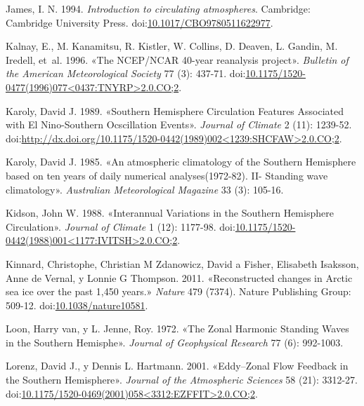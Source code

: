 \documentclass[spanish,a4paper,12p]{book}
\begin{document}
\hypertarget{ref-James}{}
James, I. N. 1994. \emph{Introduction to circulating atmospheres}.
Cambridge: Cambridge University Press.
doi:\href{https://doi.org/10.1017/CBO9780511622977}{10.1017/CBO9780511622977}.

\hypertarget{ref-Kalnay1996}{}
Kalnay, E., M. Kanamitsu, R. Kistler, W. Collins, D. Deaven, L. Gandin,
M. Iredell, et~al. 1996. «The NCEP/NCAR 40-year reanalysis project».
\emph{Bulletin of the American Meteorological Society} 77 (3): 437-71.
doi:\href{https://doi.org/10.1175/1520-0477(1996)077\%3C0437:TNYRP\%3E2.0.CO;2}{10.1175/1520-0477(1996)077\textless{}0437:TNYRP\textgreater{}2.0.CO;2}.

\hypertarget{ref-Karoly1989}{}
Karoly, David J. 1989. «Southern Hemisphere Circulation Features
Associated with El Nino-Southern Ocscillation Events». \emph{Journal of
Climate} 2 (11): 1239-52.
doi:\href{https://doi.org/http://dx.doi.org/10.1175/1520-0442(1989)002\%3C1239:SHCFAW\%3E2.0.CO;2}{http://dx.doi.org/10.1175/1520-0442(1989)002\textless{}1239:SHCFAW\textgreater{}2.0.CO;2}.

\hypertarget{ref-Karoly1985}{}
Karoly, David J. 1985. «An atmospheric climatology of the Southern
Hemisphere based on ten years of daily numerical analyses(1972-82). II-
Standing wave climatology». \emph{Australian Meteorological Magazine} 33
(3): 105-16.

\hypertarget{ref-Kidson1988}{}
Kidson, John W. 1988. «Interannual Variations in the Southern Hemisphere
Circulation». \emph{Journal of Climate} 1 (12): 1177-98.
doi:\href{https://doi.org/10.1175/1520-0442(1988)001\%3C1177:IVITSH\%3E2.0.CO;2}{10.1175/1520-0442(1988)001\textless{}1177:IVITSH\textgreater{}2.0.CO;2}.

\hypertarget{ref-Kinnard2011}{}
Kinnard, Christophe, Christian M Zdanowicz, David a Fisher, Elisabeth
Isaksson, Anne de Vernal, y Lonnie G Thompson. 2011. «Reconstructed
changes in Arctic sea ice over the past 1,450 years.» \emph{Nature} 479
(7374). Nature Publishing Group: 509-12.
doi:\href{https://doi.org/10.1038/nature10581}{10.1038/nature10581}.

\hypertarget{ref-Loon1972}{}
Loon, Harry van, y L. Jenne, Roy. 1972. «The Zonal Harmonic Standing
Waves in the Southern Hemisphe». \emph{Journal of Geophysical Research}
77 (6): 992-1003.

\hypertarget{ref-Lorenz2001}{}
Lorenz, David J., y Dennis L. Hartmann. 2001. «Eddy--Zonal Flow Feedback
in the Southern Hemisphere». \emph{Journal of the Atmospheric Sciences}
58 (21): 3312-27.
doi:\href{https://doi.org/10.1175/1520-0469(2001)058\%3C3312:EZFFIT\%3E2.0.CO;2}{10.1175/1520-0469(2001)058\textless{}3312:EZFFIT\textgreater{}2.0.CO;2}.
\end{document}
